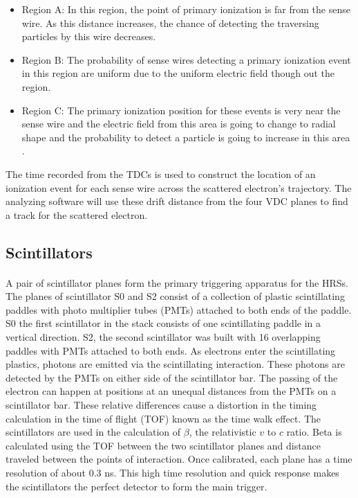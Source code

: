 	\begin{itemize}
		\item Region A: In this region, the point of primary ionization is far from the sense wire. As this distance increases, the chance of detecting the traversing particles by this wire decreases. 
		\item Region B: The probability of sense wires detecting a primary ionization event in this region are uniform due to the uniform electric field though out the region. 
		\item Region C: The primary ionization position for these events is very near the sense wire and the electric field from this area is going to change to radial shape and the 	probability to detect a particle is going to increase in this area \cite{primer}.
	\end{itemize}	
The time recorded from the TDCs is used to construct the location of an ionization event for each sense wire across the scattered electron's trajectory. The analyzing software will use these drift distance from the four VDC planes to find a track for the scattered electron.



	\subsection{Scintillators}\label{sec:scin}
	\paragraph{} A pair of scintillator planes form the primary triggering apparatus for the HRSs. The planes of scintillator S0 and S2 consist of a collection of plastic scintillating paddles with photo multiplier tubes (PMTs) attached to both ends of the paddle. S0 the first scintillator in the stack consists of one scintillating paddle in a vertical direction. S2, the second scintillator was built with 16 overlapping paddles with PMTs attached to both ends. As electrons enter the scintillating plastics, photons are emitted via the scintillating interaction. These photons are detected by the PMTs on either side of the scintillator bar. The passing of the electron can happen at positions at an unequal distances from the PMTs on a scintillator bar. These relative differences cause a distortion in the timing calculation in the time of flight (TOF) known as the time walk effect. The scintillators are used in the calculation of $\beta$, the relativistic $v$ to $c$ ratio. Beta is calculated using the TOF between the two scintillator planes and distance traveled between the points of interaction. 
	Once calibrated, each plane has a time resolution of about 0.3 ns. This high time resolution and quick response makes the scintillators the perfect detector to form the main trigger.  
	
